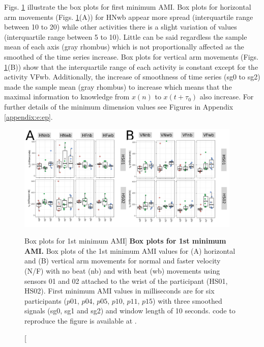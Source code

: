 Figs. \ref{fig:AMI-hii} illustrate the box plots for first minimum AMI.
Box plots for horizontal arm movements (Figs. \ref{fig:AMI-hii}(A)) for 
HNwb appear more spread (interquartile range between 10 to 20) while 
other activities there is a slight variation of values 
(interquartile range between 5 to 10).
Little can be said regardless the sample mean of each axis (gray rhombus) 
which is not proportionally affected as the smoothed of the time series 
increase.
Box plots for vertical arm movements (Figs. \ref{fig:AMI-hii}(B)) 
show that the interquartile range of each activity is constant
except for the activity VFwb.
Additionally, the increase of smoothness of time series (sg0 to sg2) made 
the sample mean (gray rhombus) to increase which means that 
the maximal information to knowledge from $x(n)$ to $x(t+\tau_0)$ also 
increase.
For further details of the minimum dimension values see
Figures in Appendix \ref{appendix:e:ep}.
\begin{figure}
\centering
\includegraphics[width=0.95\textwidth]{fig_5_04}
	\caption
	[Box plots for 1st minimum AMI]{
	{\bf Box plots for 1st minimum AMI.} 
		Box plots of the 1st minimum AMI values for 
		(A) horizontal and (B) vertical arm movements for
		normal and faster velocity (N/F) with no beat (nb) 
		and with beat (wb) movements
		using sensors 01 and 02 attached to the wrist of the 
		participant (HS01, HS02).
		First minimum AMI values in milliseconds are 
		for six participants 
		($p01$, $p04$, $p05$, $p10$, $p11$, $p15$) with three 
		smoothed signals (sg0, sg1 and sg2)
		and window length of 10 seconds.
	\R code to reproduce the figure is available at 
	.
        }
    \label{fig:AMI-hii}
\end{figure}


